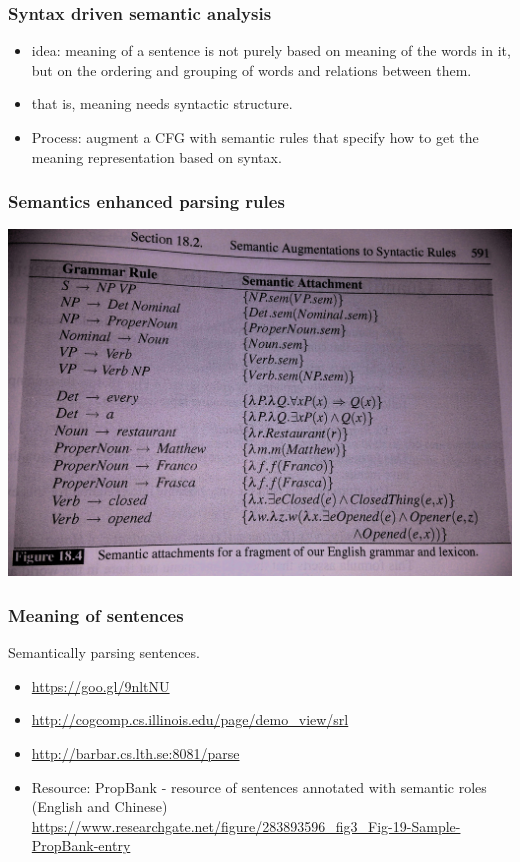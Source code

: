 \documentclass{beamer}
\begin{document}
\begin{frame}
\frametitle{Syntax driven semantic analysis}
\begin{itemize}
\item idea: meaning of a sentence is not purely based on meaning of the words in it, but on the ordering and grouping of words and relations between them.
\item that is, meaning needs syntactic structure.
\item Process: augment a CFG with semantic rules that specify how to get the meaning representation based on syntax. 
\end{itemize}
\end{frame}

\begin{frame}
\frametitle{Semantics enhanced parsing rules}
\includegraphics[angle=90,width=\textwidth]{semanticrules.jpg}
\end{frame}

\begin{frame}
\frametitle{Meaning of sentences}
Semantically parsing sentences. 
\begin{itemize}
\item \url{https://goo.gl/9nltNU}
\item \url{http://cogcomp.cs.illinois.edu/page/demo_view/srl}
\item \url{http://barbar.cs.lth.se:8081/parse}
\item Resource: PropBank - resource of sentences annotated with semantic roles (English and Chinese)
\\ \url{https://www.researchgate.net/figure/283893596_fig3_Fig-19-Sample-PropBank-entry}
\end{itemize}
\end{frame}
\end{document}
